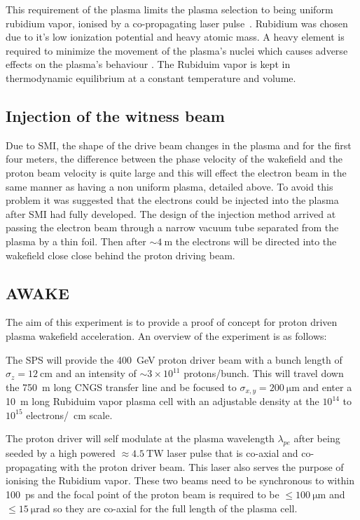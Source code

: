 \documentclass[a4paper]{report}
\begin{document}
This requirement of the plasma limits the plasma selection to being uniform
rubidium vapor, ionised by a co-propagating laser
pulse~\cite{oz2014novel,oz2014bja}.  Rubidium was chosen due to it's low
ionization potential and heavy atomic mass.  A heavy element is required to
minimize the movement of the plasma's nuclei which causes adverse effects on
the plasma's behaviour \cite{vieira2012nj, vieira2014bqa}. The Rubiduim vapor
is kept in thermodynamic equilibrium at a constant temperature and volume.

\subsection{Injection of the witness beam}

Due to SMI, the shape of the drive beam changes in the plasma and for the first
four meters, the difference between the phase velocity of the wakefield and the
proton beam velocity is quite large and this will effect the electron beam in
the same manner as having a non uniform plasma, detailed above. To avoid this
problem it was suggested that the electrons could be injected into the plasma
after SMI had fully developed. The design of the injection method arrived at
passing the electron beam through a narrow vacuum tube separated from the
plasma by a thin foil. Then after \(\sim \SI{4}{\meter}\) the electrons will be
directed into the wakefield close close behind the proton driving beam.

\subsection{AWAKE}

The aim of this experiment is to provide a proof of concept for proton driven
plasma wakefield acceleration.  An overview of the experiment is as follows:

The SPS will provide the \SI{400}{\giga\electronvolt} proton driver beam with a
bunch length of \(\sigma_z = \SI{12}{\centi\meter}\) and an intensity of \(\sim
3\times 10^{11}\) protons/bunch. This will travel down the \SI{750}{\meter}
long CNGS transfer line and be focused to \(\sigma_{x,y} =
\SI{200}{\micro\meter}\) and enter a \SI{10}{\meter} long Rubiduim vapor plasma
cell with an adjustable density at the \(10^{14}\) to \(10^{15}\)
electrons/\si{\per\centi\meter} scale.

The proton driver will self modulate at the plasma wavelength \(\lambda_{pe}\)
after being seeded by a high powered \(\approx \SI{4.5}{\tera\watt}\) laser
pulse that is co-axial and co-propagating with the proton driver beam. This
laser also serves the purpose of ionising the Rubidium vapor. These two beams
need to be synchronous to within \SI{100}{\pico\second} and the focal point of
the proton beam is required to be \(\le\SI{100}{\micro\meter}\) and
\(\le\SI{15}{\micro\radian}\) so they are co-axial for the full length of the
plasma cell.
\end{document}
